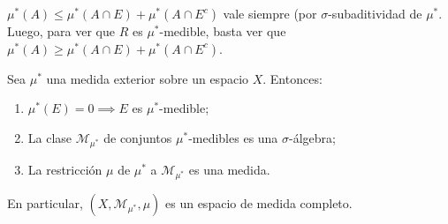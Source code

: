 \begin{observe}
	$\mu^{*}(A) \leq \mu^{*}(A \cap E) + \mu^{*}(A \cap E^c)$ vale siempre (por $\sigma$-subaditividad de $\mu^{*}$. Luego, para ver que $R$ es $\mu^{*}$-medible, basta ver que $\mu^{*}(A) \geq \mu^{*}(A \cap E) + \mu^{*}(A \cap E^c)$.
\end{observe}

\begin{theorem}
	Sea $\mu^{*}$ una medida exterior sobre un espacio $X$. Entonces:
	\begin{enumerate}
		\item $\mu^{*}(E) = 0 \implies E$ es $\mu^{*}$-medible;

		\item La clase $\mathscr{M}_{\mu^{*}}$ de conjuntos $\mu^{*}$-medibles es una $\sigma$-álgebra;

		\item La restricción $\mu$ de $\mu^{*}$ a $\mathscr{M}_{\mu^{*}}$ es una medida.
	\end{enumerate}
	En particular, $(X,\mathscr{M}_{\mu^{*}},\mu)$ es un espacio de medida completo.
\end{theorem}
